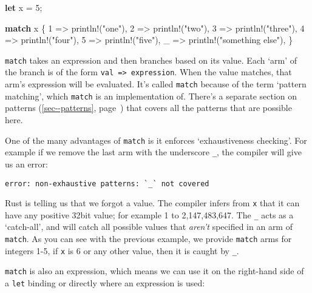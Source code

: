 \documentclass[a4paper,]{book}
\renewcommand*{\hyperref}[2][\ar]{%
  \def\ar{#2}%
  #2 (\autoref{#1}, page~\pageref{#1})}
\newenvironment{Shaded}{\begin{snugshade}}{\end{snugshade}}
\newcommand{\KeywordTok}[1]{\textcolor[rgb]{0.13,0.29,0.53}{\textbf{{#1}}}}
\newcommand{\DecValTok}[1]{\textcolor[rgb]{0.00,0.00,0.81}{{#1}}}
\newcommand{\StringTok}[1]{\textcolor[rgb]{0.31,0.60,0.02}{{#1}}}
\newcommand{\OtherTok}[1]{\textcolor[rgb]{0.56,0.35,0.01}{{#1}}}
\newcommand{\NormalTok}[1]{{#1}}
\begin{document}
\begin{Shaded}
\begin{Highlighting}[]
\KeywordTok{let} \NormalTok{x = }\DecValTok{5}\NormalTok{;}

\KeywordTok{match} \NormalTok{x \{}
    \DecValTok{1} \NormalTok{=> }\OtherTok{println!}\NormalTok{(}\StringTok{"one"}\NormalTok{),}
    \DecValTok{2} \NormalTok{=> }\OtherTok{println!}\NormalTok{(}\StringTok{"two"}\NormalTok{),}
    \DecValTok{3} \NormalTok{=> }\OtherTok{println!}\NormalTok{(}\StringTok{"three"}\NormalTok{),}
    \DecValTok{4} \NormalTok{=> }\OtherTok{println!}\NormalTok{(}\StringTok{"four"}\NormalTok{),}
    \DecValTok{5} \NormalTok{=> }\OtherTok{println!}\NormalTok{(}\StringTok{"five"}\NormalTok{),}
    \NormalTok{_ => }\OtherTok{println!}\NormalTok{(}\StringTok{"something else"}\NormalTok{),}
\NormalTok{\}}
\end{Highlighting}
\end{Shaded}

\texttt{match} takes an expression and then branches based on its value.
Each `arm' of the branch is of the form
\texttt{val\ =\textgreater{}\ expression}. When the value matches, that
arm's expression will be evaluated. It's called \texttt{match} because
of the term `pattern matching', which \texttt{match} is an
implementation of. There's a \hyperref[sec--patterns]{separate section
on patterns} that covers all the patterns that are possible here.

One of the many advantages of \texttt{match} is it enforces
`exhaustiveness checking'. For example if we remove the last arm with
the underscore \texttt{\_}, the compiler will give us an error:

\begin{verbatim}
error: non-exhaustive patterns: `_` not covered
\end{verbatim}

Rust is telling us that we forgot a value. The compiler infers from
\texttt{x} that it can have any positive 32bit value; for example 1 to
2,147,483,647. The \texttt{\_} acts as a `catch-all', and will catch all
possible values that \emph{aren't} specified in an arm of
\texttt{match}. As you can see with the previous example, we provide
\texttt{match} arms for integers 1-5, if \texttt{x} is 6 or any other
value, then it is caught by \texttt{\_}.

\texttt{match} is also an expression, which means we can use it on the
right-hand side of a \texttt{let} binding or directly where an
expression is used:
\end{document}
